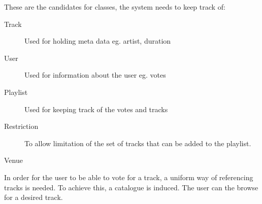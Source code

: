 These are the candidates for classes, the system needs to keep track of:
\begin{description}
	\item[Track]
	
	Used for holding meta data eg. artist, duration
	\item[User]
	
	Used for information about the user eg. votes
	\item[Playlist]
	
	Used for keeping track of the votes and tracks
	\item[Restriction] 
	
	To allow limitation of the set of tracks that can be added to the playlist.
	\item[Venue]
	
	
\end{description}

In order for the user to be able to vote for a track, a uniform way of referencing tracks is needed. To achieve this, a catalogue is induced. The user can the browse for a desired track.